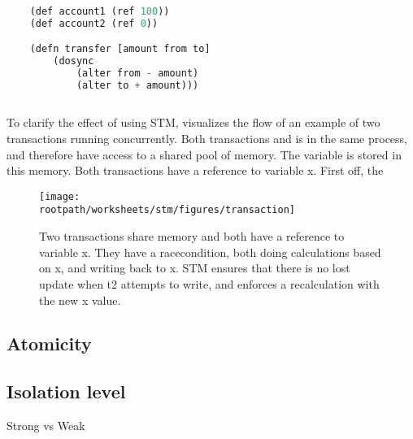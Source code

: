 \begin{lstlisting}[label=lst:stmexample,
  caption={STM in Clojure},
  language=Lisp,  
  showspaces=false,
  showtabs=false,
  breaklines=true,
  showstringspaces=false,
  breakatwhitespace=true,
  commentstyle=\color{greencomments},
  keywordstyle=\color{bluekeywords},
  stringstyle=\color{redstrings}]  % Start your code-block

	(def account1 (ref 100))
	(def account2 (ref 0))

	(defn transfer [amount from to]
    	(dosync
    		(alter from - amount)
    		(alter to + amount)))
       
\end{lstlisting}



To clarify the effect of using \ac{STM},  visualizes the flow of an example of two transactions running concurrently. Both transactions  and  is in the same process, and therefore have access to a shared pool of memory. The variable  is stored in this memory. Both transactions have a reference to variable x. First off, the 

\begin{figure}[h!]
\centering
\texttt{[image: \\rootpath/worksheets/stm/figures/transaction]}
\caption{Two transactions share memory and both have a reference to variable x. They have a racecondition, both doing calculations based on x, and writing back to x. \ac{STM} ensures that there is no lost update when t2 attempts to write, and enforces a recalculation with the new x value.}\label{fig:transaction}
\end{figure}

\subsection{Atomicity}
\subsection{Isolation level}
Strong vs Weak\\


